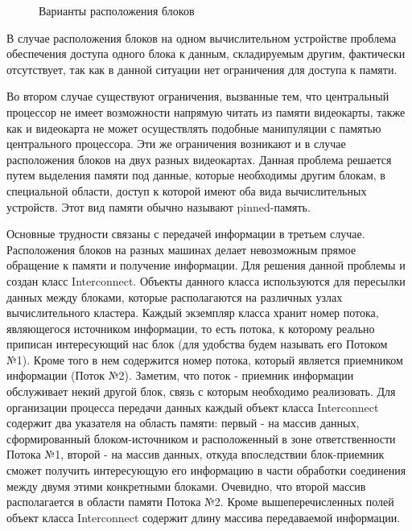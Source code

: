 \documentclass[a4paper, 14pt]{extarticle}
\theoremstyle{definition}
\begin{document}
\begin{figure}[h]
\begin{minipage}[h]{1.0\linewidth}
	\end{minipage}
	\caption{Варианты расположения блоков}
	\label{ris:var}
\end{figure}

\par В случае расположения блоков на одном вычислительном устройстве проблема обеспечения доступа одного блока к данным, складируемым другим, фактически отсутствует, так как в данной ситуации нет ограничения для доступа к памяти.

\par Во втором случае существуют ограничения, вызванные тем, что центральный процессор не имеет возможности напрямую читать из памяти видеокарты, также как и видеокарта не может осуществлять подобные манипуляции с памятью центрального процессора. Эти же ограничения возникают и в случае расположения блоков на двух разных видеокартах. Данная проблема решается путем выделения памяти под данные, которые необходимы другим блокам, в специальной области, доступ к которой имеют оба вида вычислительных устройств. Этот вид памяти обычно называют pinned-память.

\par Основные трудности связаны с передачей информации в третьем случае. Расположения блоков на разных машинах делает невозможным прямое обращение к памяти и получение информации. Для решения данной проблемы и создан класс Interconnect. Объекты данного класса используются для пересылки данных между блоками, которые располагаются на различных узлах вычислительного кластера. Каждый экземпляр класса хранит номер потока, являющегося источником информации, то есть потока, к которому реально приписан интересующий нас блок (для удобства будем называть его Потоком №1). Кроме того в нем содержится номер потока, который является приемником информации (Поток №2). Заметим, что поток - приемник информации обслуживает некий другой блок, связь с которым необходимо реализовать. Для организации процесса передачи данных каждый объект класса Interconnect содержит два указателя на область памяти: первый - на массив данных, сформированный блоком-источником и расположенный в зоне ответственности Потока №1, второй - на массив данных, откуда впоследствии блок-приемник сможет получить интересующую его информацию в части обработки соединения между двумя этими конкретными блоками. Очевидно, что второй массив располагается в области памяти Потока №2. Кроме вышеперечисленных полей объект класса Interconnect содержит длину массива передаваемой информации.
\end{document}
